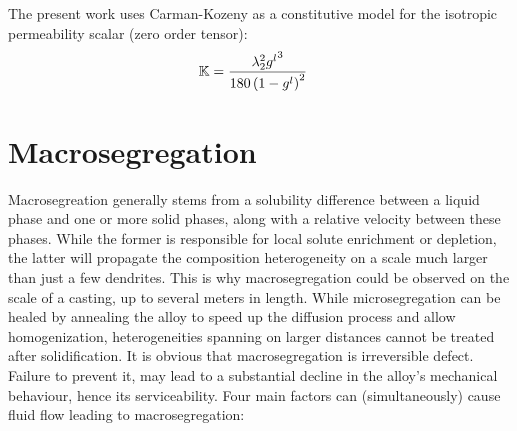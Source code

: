 The present work uses Carman-Kozeny as a constitutive model for the isotropic permeability scalar (zero order tensor):
\begin{align}
\label{eq:permeability}
& \mathbb{K}  = \frac{{\lambda}_{2}^2 {g^l}^3}{180\left( 1-{g^l} \right)^2}
\end{align}
%
%
\section{Macrosegregation}
%
Macrosegreation generally stems from a solubility difference between a liquid phase and one or more solid phases, along with
a relative velocity between these phases. While the former is responsible for local solute enrichment or depletion, the latter
will propagate the composition heterogeneity on a scale much larger than just a few dendrites.
This is why macrosegregation could be observed on the scale of a casting, up to several meters in length. 
While microsegregation can be healed by annealing the alloy to speed up the diffusion process and allow homogenization, heterogeneities 
spanning on larger distances cannot be treated after solidification. It is obvious that macrosegregation is irreversible defect. 
Failure to prevent it, may lead to a substantial decline in the alloy's mechanical behaviour, hence its serviceability.
%
%
Four main factors can (simultaneously) cause fluid flow leading to macrosegregation:
%
